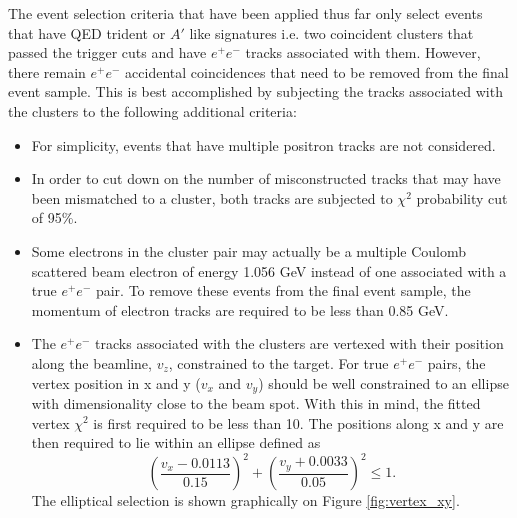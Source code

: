 The event selection criteria that have been applied thus far only select 
events that have QED trident or $A'$ like signatures i.e. two coincident clusters that
passed the trigger cuts and have $e^+e^-$ tracks associated with them.  However, 
there remain $e^+e^-$ accidental coincidences that need to be removed from the final 
event sample.  This is best accomplished by subjecting the tracks associated 
with the clusters to the following additional criteria:
\begin{itemize}
    \item For simplicity, events that have multiple positron tracks are not 
          considered.
    \item In order to cut down on the number of misconstructed tracks that may
          have been mismatched to a cluster, both tracks are subjected to 
          $\chi^2$ probability cut of 95\%.
    \item Some electrons in the cluster pair may actually be a multiple
          Coulomb scattered beam electron of energy 1.056 GeV 
          instead of one associated with a true $e^+e^-$ 
          pair.  To remove these events from the final event sample, the 
          momentum of electron tracks are required to be less than 0.85 GeV.
    \item The $e^+e^-$ tracks associated with the clusters are vertexed with 
          their position along the beamline, $v_z$, constrained to the target. 
          For true $e^+e^-$ pairs, the vertex position in x and y ($v_x$ and $v_y$) should be
          well constrained to an ellipse with dimensionality close to the beam 
          spot.  With this in mind, the fitted vertex $\chi^2$ is first required 
          to be less than 10.  The positions along x and y are then required 
          to lie within an ellipse 
          defined as
          \[
          \left (\frac{v_x - 0.0113}{0.15} \right)^2 + \left(\frac{v_y + 0.0033}{0.05} \right)^2  \le 1.
          \]
          The elliptical selection is shown graphically on Figure \ref{fig:vertex_xy}.
\end{itemize}

